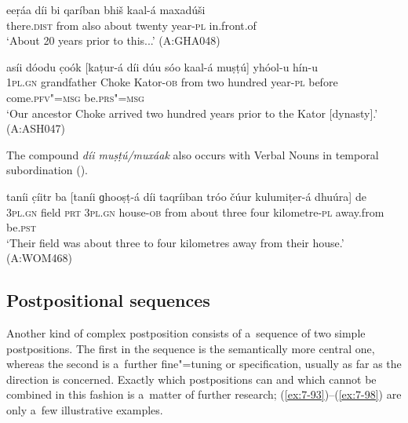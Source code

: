 
\begin{exe}
\ex
\label{ex:7-90}
\gll eeṛáa díi bi qaríban bhiš kaal-á maxadúši \\
there.\textsc{dist} from also about twenty year-\textsc{pl} in.front.of \\
\glt `About 20 years prior to this...' (A:GHA048)
\end{exe}
\begin{exe}
\ex
\label{ex:7-91}
\gll asíi dóodu c̣oók [kaṭur-á díi dúu sóo kaal-á muṣṭú] yhóol-u
hín-u \\
\textsc{1pl.gn} grandfather Choke Kator-\textsc{ob} from two hundred year-\textsc{pl} before come.\textsc{pfv"=msg} be.\textsc{prs"=msg}  \\
\glt `Our ancestor Choke arrived two hundred years prior to the Kator [dynasty].' (A:ASH047)
\end{exe}

The compound \textit{díi muṣṭú/muxáak} also occurs with Verbal Nouns in temporal subordination (). 



\begin{exe}
\ex
\label{ex:7-92}
\gll taníi c̣íitr ba [taníi ɡhooṣṭ-á díi taqríiban tróo čúur
  kulumiṭer-á dhuúra] de \\
\textsc{3pl.gn} field \textsc{prt} \textsc{3pl.gn} house-\textsc{ob} from about three four kilometre-\textsc{pl} away.from be.\textsc{pst}  \\
\glt `Their field was about three to four kilometres away from their house.' (A:WOM468)
\end{exe}

\subsection{Postpositional sequences}
\label{subsec:7-2-4}

Another kind of complex postposition consists of a~sequence of two simple postpositions. The first in the sequence is the semantically more central one, whereas the second is a~further fine"=tuning or specification, usually as far as the direction is concerned. Exactly which postpositions can and which cannot be combined in this fashion is a~matter of further research; (\ref{ex:7-93})--(\ref{ex:7-98}) are only a~few illustrative examples.

